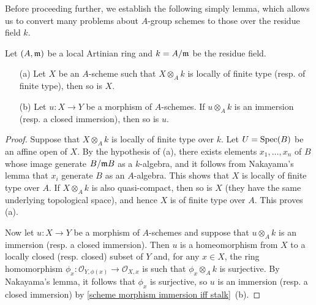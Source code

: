 Before proceeding further, we establish the following simply lemma, which allows us to convert many problems about $A$-group schemes to those over the residue field $k$.

\begin{lemma}\label{scheme over local Artinian ft closed immersion if closed fiber}
Let $(A,\mathfrak{m})$ be a local Artinian ring and $k=A/\mathfrak{m}$ be the residue field.
\begin{enumerate}
    \item[(a)] Let $X$ be an $A$-scheme such that $X\otimes_Ak$ is locally of finite type (resp. of finite type), then so is $X$.
    \item[(b)] Let $u:X\to Y$ be a morphism of $A$-schemes. If $u\otimes_Ak$ is an immersion (resp. a closed immersion), then so is $u$.
\end{enumerate}
\end{lemma}
\begin{proof}
Suppose that $X\otimes_Ak$ is locally of finite type over $k$. Let $U=\mathrm{Spec}(B)$ be an affine open of $X$. By the hypothesis of (a), there exists elements $x_1,\dots,x_n$ of $B$ whose image generate $B/\mathfrak{m} B$ as a $k$-algebra, and it follows from Nakayama's lemma that $x_i$ generate $B$ as an $A$-algebra. This shows that $X$ is locally of finite type over $A$. If $X\otimes_Ak$ is also quasi-compact, then so is $X$ (they have the same underlying topological space), and hence $X$ is of finite type over $A$. This proves (a).\par
Now let $u:X\to Y$ be a morphism of $A$-schemes and suppose that $u\otimes_Ak$ is an immersion (resp. a closed immersion). Then $u$ is a homeomorphism from $X$ to a locally closed (resp. closed) subset of $Y$ and, for any $x\in X$, the ring homomorphism $\phi_x:\mathscr{O}_{Y,\phi(x)}\to\mathscr{O}_{X,x}$ is such that $\phi_x\otimes_Ak$ is surjective. By Nakayama's lemma, it follows that $\phi_x$ is surjective, so $u$ is an immersion (resp. a closed immersion) by \cref{scheme morphism immersion iff stalk}~(b).
\end{proof}

